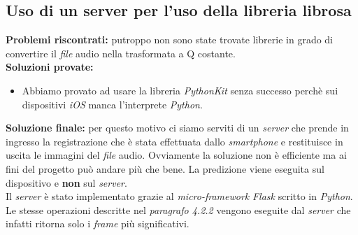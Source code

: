 \subsection{Uso di un server per l'uso della libreria librosa}
\textbf{Problemi riscontrati:} putroppo non sono state trovate librerie in grado di convertire il \textit{file} audio nella trasformata a Q costante.\\
\newline
%
\textbf{Soluzioni provate:}
\begin{itemize}
	\item Abbiamo provato ad usare la libreria \textit{PythonKit} senza successo perchè sui dispositivi \textit{iOS} manca l'interprete \textit{Python}.\\
\end{itemize}
%
\textbf{Soluzione finale:} per questo motivo ci siamo serviti di un \textit{server} che prende in ingresso la registrazione che è stata effettuata dallo \textit{smartphone} e restituisce in uscita le immagini del \textit{file} audio. Ovviamente la soluzione non è efficiente ma ai fini del progetto può andare più che bene. La predizione viene eseguita sul dispositivo e \textbf{non} sul \textit{server}.\\
\newline
Il \textit{server} è stato implementato grazie al \textit{micro-framework} \textit{Flask} scritto in \textit{Python}.
\vspace*{2ex}
\vspace*{2ex}
Le stesse operazioni descritte nel \textit{paragrafo 4.2.2} vengono eseguite dal \textit{server} che infatti ritorna solo i \textit{frame} più significativi.
